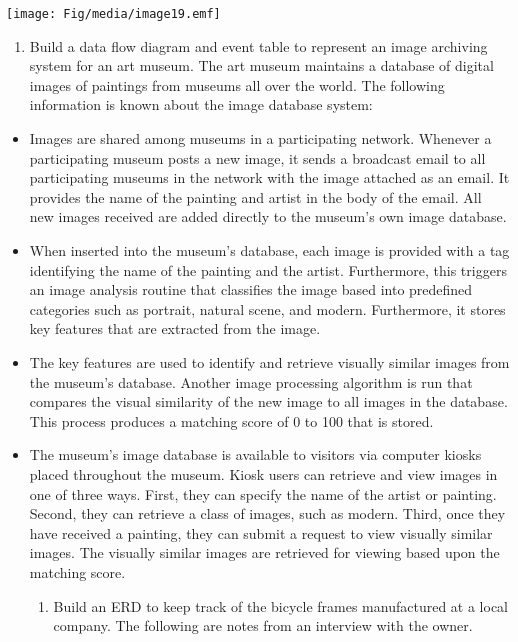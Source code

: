 \texttt{[image: Fig/media/image19.emf]}

\begin{enumerate}
\def\labelenumi{\arabic{enumi}.}
\setcounter{enumi}{4}
\item
  Build a data flow diagram and event table to represent an image
  archiving system for an art museum. The art museum maintains a
  database of digital images of paintings from museums all over the
  world. The following information is known about the image database
  system:
\end{enumerate}

\begin{itemize}
\item
  Images are shared among museums in a participating network. Whenever a
  participating museum posts a new image, it sends a broadcast email to
  all participating museums in the network with the image attached as an
  email. It provides the name of the painting and artist in the body of
  the email. All new images received are added directly to the museum's
  own image database.
\item
  When inserted into the museum's database, each image is provided with
  a tag identifying the name of the painting and the artist.
  Furthermore, this triggers an image analysis routine that classifies
  the image based into predefined categories such as portrait, natural
  scene, and modern. Furthermore, it stores key features that are
  extracted from the image.
\item
  The key features are used to identify and retrieve visually similar
  images from the museum's database. Another image processing algorithm
  is run that compares the visual similarity of the new image to all
  images in the database. This process produces a matching score of 0 to
  100 that is stored.
\item
  The museum's image database is available to visitors via computer
  kiosks placed throughout the museum. Kiosk users can retrieve and view
  images in one of three ways. First, they can specify the name of the
  artist or painting. Second, they can retrieve a class of images, such
  as modern. Third, once they have received a painting, they can submit
  a request to view visually similar images. The visually similar images
  are retrieved for viewing based upon the matching score.

  \begin{enumerate}
  \def\labelenumi{\arabic{enumi}.}
  \item
    Build an ERD to keep track of the bicycle frames manufactured at a
    local company. The following are notes from an interview with the
    owner.
  \end{enumerate}
\end{itemize}

